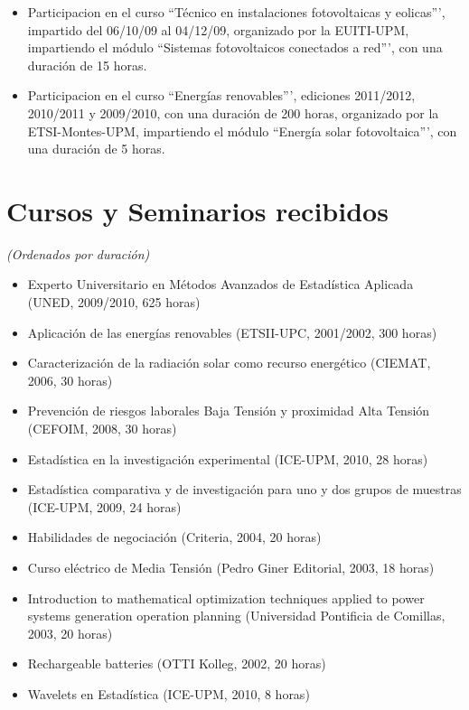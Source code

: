 \documentclass[article, a4paper]{memoir}
\begin{document}
\begin{itemize}
\item Participacion en el curso ``Técnico en instalaciones
fotovoltaicas y eolicas''', impartido del 06/10/09 al 04/12/09,
organizado por la EUITI-UPM, impartiendo el módulo ``Sistemas
fotovoltaicos conectados a red''', con una duración de 15 horas.

\item Participacion en el curso ``Energías renovables''', ediciones
2011/2012, 2010/2011 y 2009/2010, con una duración de 200
horas, organizado por la ETSI-Montes-UPM, impartiendo el módulo
``Energía solar fotovoltaica''', con una duración de 5 horas.
\end{itemize}



\section{Cursos y Seminarios recibidos}
\label{sec-9}

\emph{(Ordenados por duración)}


\begin{itemize}
\item Experto Universitario en Métodos Avanzados de Estadística
Aplicada (UNED, 2009/2010, 625 horas)

\item Aplicación de las energías renovables (ETSII-UPC, 2001/2002, 300
horas)

\item Caracterización de la radiación solar como recurso energético
(CIEMAT, 2006, 30 horas)

\item Prevención de riesgos laborales Baja Tensión y proximidad Alta
Tensión (CEFOIM, 2008, 30 horas)

\item Estadística en la investigación experimental (ICE-UPM, 2010, 28
horas)

\item Estadística comparativa y de investigación para uno y dos grupos
de muestras (ICE-UPM, 2009, 24 horas)

\item Habilidades de negociación (Criteria, 2004, 20 horas)

\item Curso eléctrico de Media Tensión (Pedro Giner Editorial, 2003,
18 horas)

\item Introduction to mathematical optimization techniques applied to
power systems generation operation planning (Universidad
Pontificia de Comillas, 2003, 20 horas)

\item Rechargeable batteries (OTTI Kolleg, 2002, 20 horas)

\item Wavelets en Estadística (ICE-UPM, 2010, 8 horas)
\end{itemize}
\end{document}
